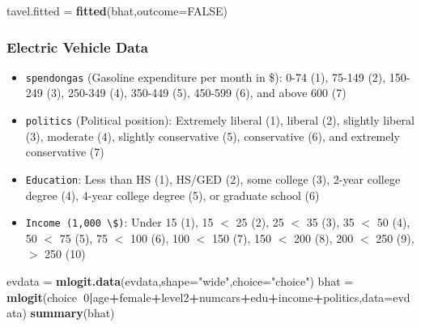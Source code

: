 \documentclass[
]{article}
\newenvironment{Shaded}{\begin{snugshade}}{\end{snugshade}}
\newcommand{\DataTypeTok}[1]{\textcolor[rgb]{0.13,0.29,0.53}{#1}}
\newcommand{\DecValTok}[1]{\textcolor[rgb]{0.00,0.00,0.81}{#1}}
\newcommand{\KeywordTok}[1]{\textcolor[rgb]{0.13,0.29,0.53}{\textbf{#1}}}
\newcommand{\NormalTok}[1]{#1}
\newcommand{\OperatorTok}[1]{\textcolor[rgb]{0.81,0.36,0.00}{\textbf{#1}}}
\newcommand{\OtherTok}[1]{\textcolor[rgb]{0.56,0.35,0.01}{#1}}
\newcommand{\StringTok}[1]{\textcolor[rgb]{0.31,0.60,0.02}{#1}}
\providecommand{\tightlist}{%
  \setlength{\itemsep}{0pt}\setlength{\parskip}{0pt}}
\begin{document}
\begin{Shaded}
\begin{Highlighting}[]
\NormalTok{tavel.fitted =}\StringTok{ }\KeywordTok{fitted}\NormalTok{(bhat,}\DataTypeTok{outcome=}\OtherTok{FALSE}\NormalTok{)}
\end{Highlighting}
\end{Shaded}

\hypertarget{electric-vehicle-data}{%
\subsubsection{Electric Vehicle Data}\label{electric-vehicle-data}}

\begin{itemize}
\tightlist
\item
  \texttt{spendongas} (Gasoline expenditure per month in \$): 0-74 (1), 75-149 (2), 150-249 (3), 250-349 (4), 350-449 (5), 450-599 (6), and above 600 (7)
\item
  \texttt{politics} (Political position): Extremely liberal (1), liberal (2), slightly liberal (3), moderate (4), slightly conservative (5), conservative (6), and extremely conservative (7)
\item
  \texttt{Education}: Less than HS (1), HS/GED (2), some college (3), 2-year college degree (4), 4-year college degree (5), or graduate school (6)
\item
  \texttt{Income\ (1,000\ \textbackslash{}\$)}: Under 15 (1), 15 \(<\) 25 (2), 25 \(<\) 35 (3), 35 \(<\) 50 (4), 50 \(<\) 75 (5), 75 \(<\) 100 (6), 100 \(<\) 150 (7), 150 \(<\) 200 (8), 200 \(<\) 250 (9), \(>\) 250 (10)
\end{itemize}

\begin{Shaded}
\begin{Highlighting}[]
\NormalTok{evdata =}\StringTok{ }\KeywordTok{mlogit.data}\NormalTok{(evdata,}\DataTypeTok{shape=}\StringTok{"wide"}\NormalTok{,}\DataTypeTok{choice=}\StringTok{"choice"}\NormalTok{)}
\NormalTok{bhat =}\StringTok{ }\KeywordTok{mlogit}\NormalTok{(choice}\OperatorTok{~}\DecValTok{0}\OperatorTok{|}\NormalTok{age}\OperatorTok{+}\NormalTok{female}\OperatorTok{+}\NormalTok{level2}\OperatorTok{+}\NormalTok{numcars}\OperatorTok{+}\NormalTok{edu}\OperatorTok{+}\NormalTok{income}\OperatorTok{+}\NormalTok{politics,}\DataTypeTok{data=}\NormalTok{evdata)}
\KeywordTok{summary}\NormalTok{(bhat)}
\end{Highlighting}
\end{Shaded}
\end{document}
